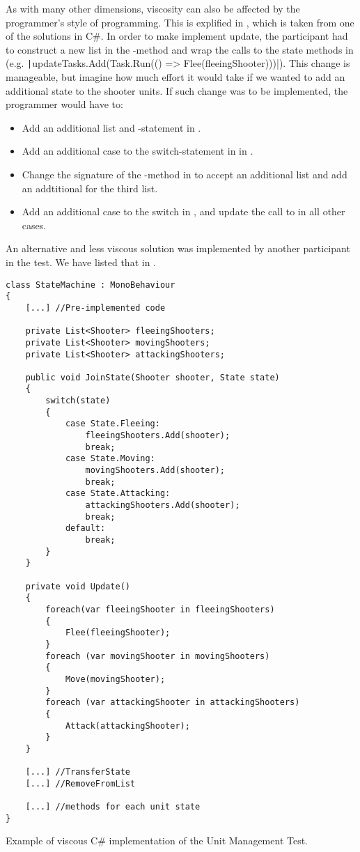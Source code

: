 As with many other dimensions, viscosity can also be affected by the programmer's style of programming. This is explified in , which is taken from one of the solutions in C\#. In order to make implement  update, the participant had to construct a new list in the -method and wrap the calls to the state methods in  (e.g. \texttt|updateTasks.Add(Task.Run(() => Flee(fleeingShooter)))|). This change is manageable, but imagine how much effort it would take if we wanted to add an additional state to the shooter units. If such change was to be implemented, the programmer would have to:
\begin{itemize}[H]
    \item Add an additional list and -statement in .
    \item Add an additional case to the switch-statement in  in .
    \item Change the signature of the -method in  to accept an additional list and add an addtitional  for the third list.
    \item Add an additional case to the switch in , and update the call to  in all other cases.
\end{itemize}
An alternative and less viscous solution was implemented by another participant in the test. We have listed that in .

\begin{listing}[H]
    \begin{verbatim}
class StateMachine : MonoBehaviour
{
    [...] //Pre-implemented code

    private List<Shooter> fleeingShooters;
    private List<Shooter> movingShooters;
    private List<Shooter> attackingShooters;

    public void JoinState(Shooter shooter, State state)
    {
        switch(state)
        {
            case State.Fleeing:
                fleeingShooters.Add(shooter);
                break;
            case State.Moving:
                movingShooters.Add(shooter);
                break;
            case State.Attacking:
                attackingShooters.Add(shooter);
                break;
            default:
                break;
        }
    }

    private void Update()
    {
        foreach(var fleeingShooter in fleeingShooters)
        {
            Flee(fleeingShooter);
        }
        foreach (var movingShooter in movingShooters)
        {
            Move(movingShooter);
        }
        foreach (var attackingShooter in attackingShooters)
        {
            Attack(attackingShooter);
        }
    }

    [...] //TransferState
    [...] //RemoveFromList

    [...] //methods for each unit state
}
    \end{verbatim}
    \caption{Example of viscous C\# implementation of the Unit Management Test.}
    \label{lst:csharp:viscous}
\end{listing}

